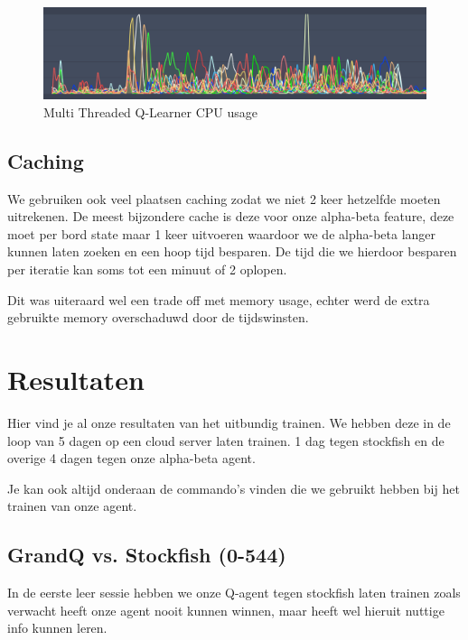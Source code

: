 \documentclass[a4paper,openany]{uantwerpenassignment}
\begin{document}
\begin{figure}[h]
    \centering
    \includegraphics[width=350pt]{images/multithreaded.png}
    \caption{Multi Threaded Q-Learner CPU usage}
    \label{fig:multithreaded}
\end{figure}

\section{Caching}
\label{caching}

We gebruiken ook veel plaatsen caching zodat we niet 2 keer hetzelfde moeten uitrekenen. De meest bijzondere cache is deze voor onze alpha-beta feature, deze moet per bord state maar 1 keer uitvoeren waardoor we de alpha-beta langer kunnen laten zoeken en een hoop tijd besparen.
De tijd die we hierdoor besparen per iteratie kan soms tot een minuut of 2 oplopen.

Dit was uiteraard wel een trade off met memory usage, echter werd de extra gebruikte memory overschaduwd door de tijdswinsten.

\chapter{Resultaten}

Hier vind je al onze resultaten van het uitbundig trainen. We hebben deze in de loop van 5 dagen op een cloud server laten trainen. 1 dag tegen stockfish en de overige 4 dagen tegen onze alpha-beta agent.

Je kan ook altijd onderaan de commando's vinden die we gebruikt hebben bij het trainen van onze agent.

\section{GrandQ vs. Stockfish (0-544)}

In de eerste leer sessie hebben we onze Q-agent tegen stockfish laten trainen zoals verwacht heeft onze agent nooit kunnen winnen, maar heeft wel hieruit nuttige info kunnen leren.
\end{document}
